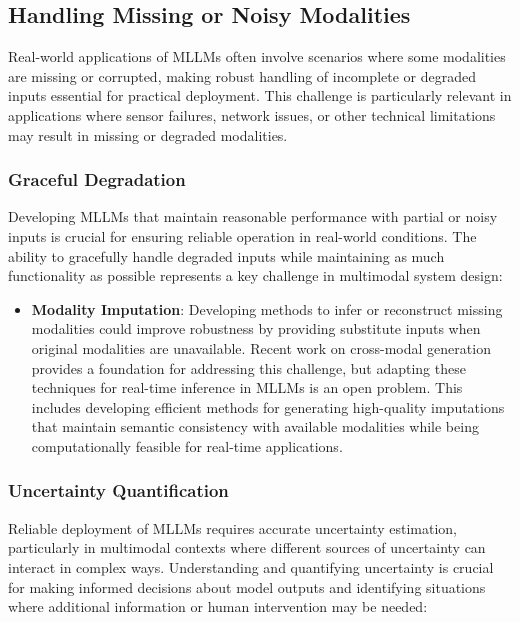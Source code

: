 \subsection{Handling Missing or Noisy Modalities}
Real-world applications of MLLMs often involve scenarios where some modalities are missing or corrupted, making robust handling of incomplete or degraded inputs essential for practical deployment. This challenge is particularly relevant in applications where sensor failures, network issues, or other technical limitations may result in missing or degraded modalities.

\subsubsection{Graceful Degradation}
Developing MLLMs that maintain reasonable performance with partial or noisy inputs is crucial for ensuring reliable operation in real-world conditions. The ability to gracefully handle degraded inputs while maintaining as much functionality as possible represents a key challenge in multimodal system design:

\begin{itemize}  
    \item \textbf{Modality Imputation}: Developing methods to infer or reconstruct missing modalities could improve robustness by providing substitute inputs when original modalities are unavailable. Recent work on cross-modal generation \citep{ramesh2021zero} provides a foundation for addressing this challenge, but adapting these techniques for real-time inference in MLLMs is an open problem. This includes developing efficient methods for generating high-quality imputations that maintain semantic consistency with available modalities while being computationally feasible for real-time applications.
\end{itemize}

\subsubsection{Uncertainty Quantification}
Reliable deployment of MLLMs requires accurate uncertainty estimation, particularly in multimodal contexts where different sources of uncertainty can interact in complex ways. Understanding and quantifying uncertainty is crucial for making informed decisions about model outputs and identifying situations where additional information or human intervention may be needed:

